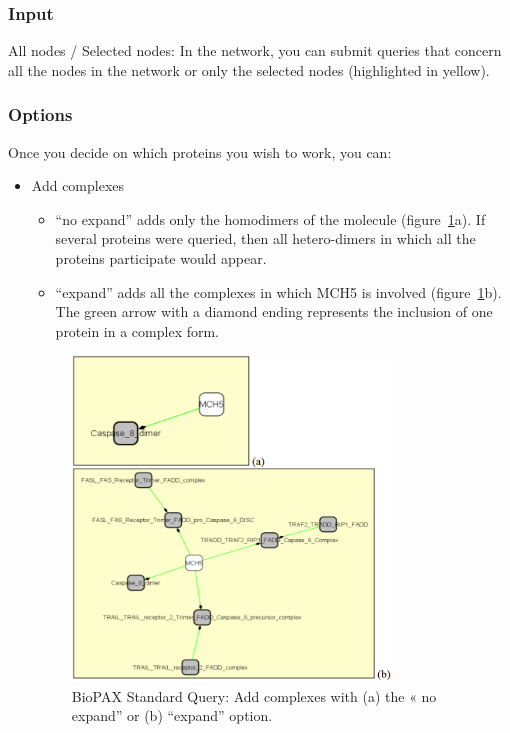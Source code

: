 \subsubsection{Input}
All nodes / Selected nodes: In the network, you can submit queries that concern all the nodes in the network or only the selected nodes (highlighted in yellow). 
\subsubsection{Options}
Once you decide on which proteins you wish to work, you can:
\begin{itemize}
\item Add complexes
\begin{itemize}
\item “no expand” adds only the homodimers of the molecule (figure~\ref{Standard_Query_Add_complexes}a). If several proteins were queried, then all hetero-dimers in which all the proteins participate would appear.
\item “expand” adds all the complexes in which MCH5 is involved (figure~\ref{Standard_Query_Add_complexes}b). The green arrow with a diamond ending represents the inclusion of one protein in a complex form.
\end{itemize}
\begin{figure}[h]
\centering
\includegraphics[width=0.8\textwidth]{graphics/Standard_Query_Add_complexes}
\caption{BioPAX Standard Query: Add complexes with (a) the « no expand” or (b) “expand” option.}
\label{Standard_Query_Add_complexes}

\end{figure}
\end{itemize}
